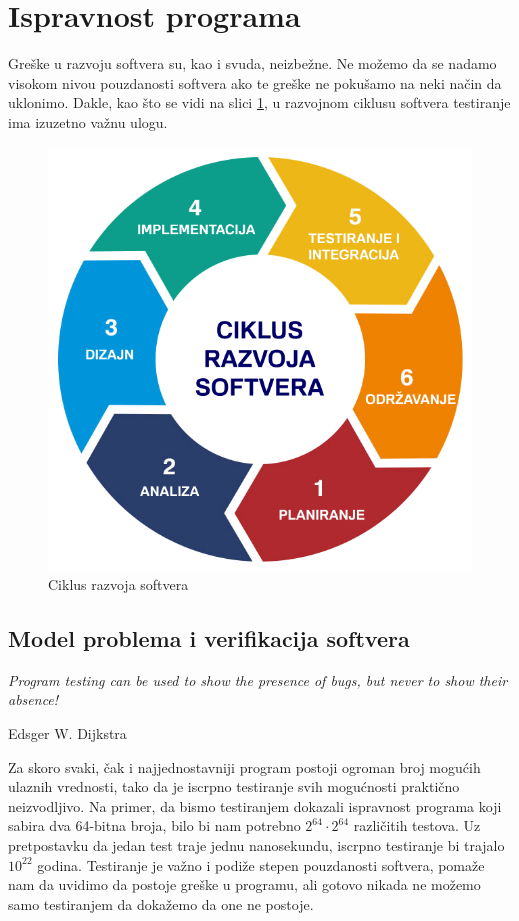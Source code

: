 \documentclass[a4paper]{article}
\begin{document}
\section{Ispravnost programa}
\label{sec:ispravnost}
Greške u razvoju softvera su, kao i svuda, neizbežne.
Ne možemo da se nadamo visokom nivou pouzdanosti softvera ako te greške ne pokušamo na neki način da uklonimo.
Dakle, kao što se vidi na slici \ref{fig:rs}, u razvojnom ciklusu softvera testiranje ima izuzetno važnu ulogu.

\begin{figure}[h!]
\begin{center}
\includegraphics[scale=0.25]{rs.png}
\end{center}
\caption{Ciklus razvoja softvera}
\label{fig:rs}
\end{figure}

\subsection{Model problema i verifikacija softvera}
\label{subsec:ali}
\epigraph{\emph{Program testing can be used to show the presence of bugs, but never to show their absence!}}{Edsger W. Dijkstra}

Za skoro svaki, čak i najjednostavniji program postoji ogroman broj mogućih ulaznih vrednosti, tako da je iscrpno testiranje svih mogućnosti praktično neizvodljivo.
Na primer, da bismo testiranjem dokazali ispravnost programa koji sabira dva 64-bitna broja, bilo bi nam potrebno $2^{64} \cdot 2^{64}$ različitih testova.
Uz pretpostavku da jedan test traje jednu nanosekundu, iscrpno testiranje bi trajalo $10^{22}$ godina.
Testiranje je važno i podiže stepen pouzdanosti softvera, pomaže nam da uvidimo da postoje greške u programu, ali gotovo nikada ne možemo samo testiranjem da dokažemo da one ne postoje.
\end{document}
